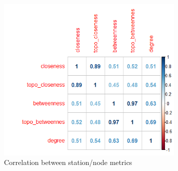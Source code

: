 \documentclass[11pt]{article} %
\begin{document}

\begin{figure}
\centering
\includegraphics[width=0.8\textwidth]{cropped_correlations}
\caption{Correlation between station/node metrics}
\end{figure}

%


\end{document}
